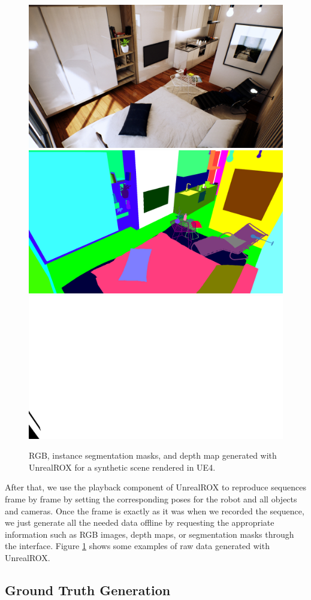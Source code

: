 \begin{figure}[!hbt]
  \centering
  \includegraphics[width=0.32\linewidth]{Figures/Sim2Real/seq_rgb}\\
  \includegraphics[width=0.33\linewidth]{Figures/Sim2Real/seq_mask}
  \includegraphics[width=0.33\linewidth]{Figures/Sim2Real/seq_depth}
  \caption{RGB, instance segmentation masks, and depth map generated with UnrealROX for a synthetic scene rendered in \acf{UE4}.}
  \label{fig:sim2real:unrealrox_overview}
\end{figure}

After that, we use the playback component of UnrealROX to reproduce sequences frame by frame by setting the corresponding poses for the robot and all objects and cameras. Once the frame is exactly as it was when we recorded the sequence, we just generate all the needed data offline by requesting the appropriate information such as RGB images, depth maps, or segmentation masks through the interface. Figure \ref{fig:sim2real:unrealrox_overview} shows some examples of raw data generated with UnrealROX.

\subsection{Ground Truth Generation}

